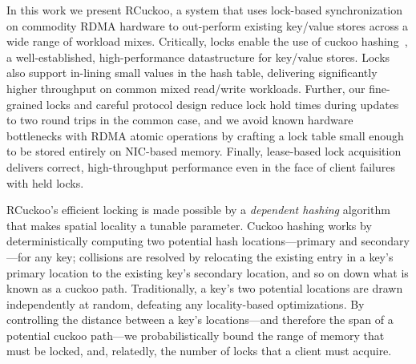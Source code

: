 In this work we present RCuckoo, a system that uses lock-based synchronization
on commodity RDMA hardware to out-perform existing key/value stores across a
wide range of workload mixes.
Critically, locks enable the use of cuckoo hashing~\cite{cuckoo}, a
well-established, high-performance datastructure for key/value stores.
Locks also support in-lining small values in the hash table,
delivering
significantly higher throughput on common mixed read/write workloads.
Further, our fine-grained locks and careful protocol design reduce
lock hold times during updates to two round trips in the common
case, and we avoid known hardware bottlenecks with RDMA atomic
operations by crafting a lock table small enough to be stored entirely
on NIC-based memory.  Finally, lease-based lock acquisition
delivers correct, high-throughput performance even in the
face of client failures with held locks.

RCuckoo's efficient locking is made possible by a \emph{dependent
hashing} algorithm that makes spatial locality a tunable parameter.
Cuckoo hashing works by deterministically computing two potential hash
locations---primary and secondary---for any key; collisions are
resolved by relocating the existing entry in a key's primary location
to the existing key's secondary location, and so on down what is known
as a cuckoo path.  Traditionally, a key's two potential locations are
drawn independently at random, defeating any locality-based
optimizations.  By controlling the distance between a key's
locations---and therefore the span of a potential cuckoo path---we
probabilistically bound the range of memory that must be locked, and,
relatedly, the number of locks that a client must acquire.





